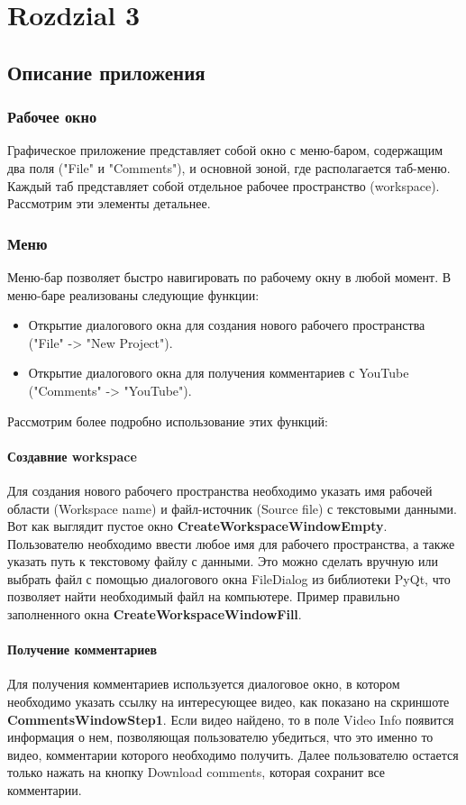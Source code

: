 \chapter{Rozdzial 3}

\section{Описание приложения}
	\subsection{Рабочее окно}
		Графическое приложение представляет собой окно с меню-баром, содержащим два поля ("File" и "Comments"), и основной зоной, где располагается таб-меню. Каждый таб представляет собой отдельное рабочее пространство (workspace). Рассмотрим эти элементы детальнее.
		
	\subsection{Меню}
		Меню-бар позволяет быстро навигировать по рабочему окну в любой момент. В меню-баре реализованы следующие функции:
		\begin{itemize}
			\item Открытие диалогового окна для создания нового рабочего пространства ("File" -> "New Project").
			\item Открытие диалогового окна для получения комментариев с YouTube ("Comments" -> "YouTube").
		\end{itemize}

		Рассмотрим более подробно использование этих функций:
		
		\subsubsection{Создавние workspace}
			Для создания нового рабочего пространства необходимо указать имя рабочей области (Workspace name) и файл-источник (Source file) с текстовыми данными. Вот как выглядит пустое окно \textbf{CreateWorkspaceWindowEmpty}. Пользователю необходимо ввести любое имя для рабочего пространства, а также указать путь к текстовому файлу с данными. Это можно сделать вручную или выбрать файл с помощью диалогового окна FileDialog из библиотеки PyQt, что позволяет найти необходимый файл на компьютере. Пример правильно заполненного окна \textbf{CreateWorkspaceWindowFill}.
		
		\subsubsection{Получение комментариев}
			Для получения комментариев используется диалоговое окно, в котором необходимо указать ссылку на интересующее видео, как показано на скриншоте \textbf{CommentsWindowStep1}. Если видео найдено, то в поле Video Info появится информация о нем, позволяющая пользователю убедиться, что это именно то видео, комментарии которого необходимо получить. Далее пользователю остается только нажать на кнопку Download comments, которая сохранит все комментарии.
				
